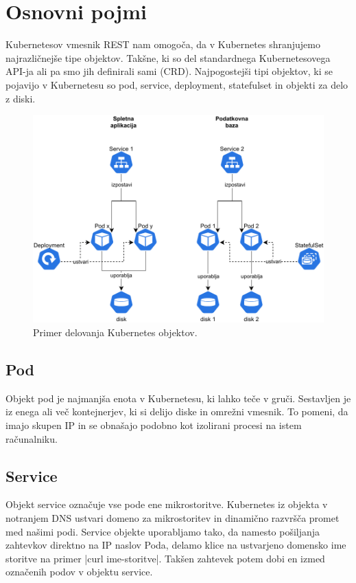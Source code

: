 \documentclass[a4paper, 12pt]{book}
\begin{document}
\section{Osnovni pojmi}
Kubernetesov vmesnik REST nam omogoča, da v Kubernetes shranjujemo najrazličnejše tipe objektov.
Takšne, ki so del standardnega Kubernetesovega API-ja ali pa smo jih definirali sami (CRD).
Najpogostejši tipi objektov, ki se pojavijo v Kubernetesu so pod, service, deployment, statefulset in objekti za delo z diski.
\begin{figure}[h]
\begin{center}
\includegraphics[width=1.0\textwidth]{images/Kubernetes-simple-schema.pdf}
\end{center}
\caption{Primer delovanja Kubernetes objektov.}
\label{problem-povezanih-clustrov}
\end{figure}
\subsection{Pod~\cite{pod}}
Objekt pod je najmanjša enota v Kubernetesu, ki lahko teče v gruči.
Sestavljen je iz enega ali več kontejnerjev, ki si delijo diske in omrežni vmesnik.
To pomeni, da imajo skupen IP in se obnašajo podobno kot izolirani procesi na istem računalniku.
\subsection{Service~\cite{service}}
Objekt service označuje vse pode ene mikrostoritve.
Kubernetes iz objekta v notranjem DNS ustvari domeno za mikrostoritev in dinamično razvršča promet med našimi podi.
Service objekte uporabljamo tako, da namesto pošiljanja zahtevkov direktno na IP naslov Poda, delamo klice na ustvarjeno domensko ime storitve na primer \spverb|curl ime-storitve|.
Takšen zahtevek potem dobi en izmed označenih podov v objektu service.
\end{document}
